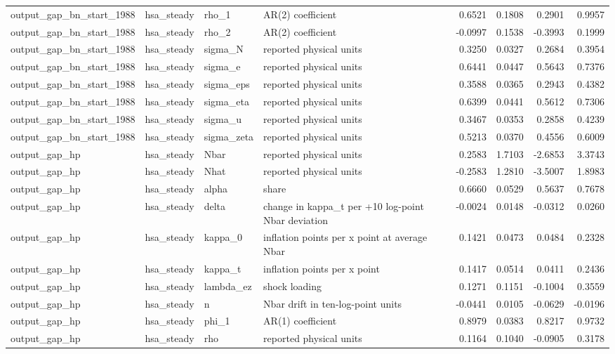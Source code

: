 \begin{tabular}{llllrrrr}
output\_gap\_bn\_start\_1988 & hsa\_steady & rho\_1 & AR(2) coefficient & 0.6521 & 0.1808 & 0.2901 & 0.9957 \\
output\_gap\_bn\_start\_1988 & hsa\_steady & rho\_2 & AR(2) coefficient & -0.0997 & 0.1538 & -0.3993 & 0.1999 \\
output\_gap\_bn\_start\_1988 & hsa\_steady & sigma\_N & reported physical units & 0.3250 & 0.0327 & 0.2684 & 0.3954 \\
output\_gap\_bn\_start\_1988 & hsa\_steady & sigma\_e & reported physical units & 0.6441 & 0.0447 & 0.5643 & 0.7376 \\
output\_gap\_bn\_start\_1988 & hsa\_steady & sigma\_eps & reported physical units & 0.3588 & 0.0365 & 0.2943 & 0.4382 \\
output\_gap\_bn\_start\_1988 & hsa\_steady & sigma\_eta & reported physical units & 0.6399 & 0.0441 & 0.5612 & 0.7306 \\
output\_gap\_bn\_start\_1988 & hsa\_steady & sigma\_u & reported physical units & 0.3467 & 0.0353 & 0.2858 & 0.4239 \\
output\_gap\_bn\_start\_1988 & hsa\_steady & sigma\_zeta & reported physical units & 0.5213 & 0.0370 & 0.4556 & 0.6009 \\
output\_gap\_hp & hsa\_steady & Nbar & reported physical units & 0.2583 & 1.7103 & -2.6853 & 3.3743 \\
output\_gap\_hp & hsa\_steady & Nhat & reported physical units & -0.2583 & 1.2810 & -3.5007 & 1.8983 \\
output\_gap\_hp & hsa\_steady & alpha & share & 0.6660 & 0.0529 & 0.5637 & 0.7678 \\
output\_gap\_hp & hsa\_steady & delta & change in kappa\_t per +10 log-point Nbar deviation & -0.0024 & 0.0148 & -0.0312 & 0.0260 \\
output\_gap\_hp & hsa\_steady & kappa\_0 & inflation points per x point at average Nbar & 0.1421 & 0.0473 & 0.0484 & 0.2328 \\
output\_gap\_hp & hsa\_steady & kappa\_t & inflation points per x point & 0.1417 & 0.0514 & 0.0411 & 0.2436 \\
output\_gap\_hp & hsa\_steady & lambda\_ez & shock loading & 0.1271 & 0.1151 & -0.1004 & 0.3559 \\
output\_gap\_hp & hsa\_steady & n & Nbar drift in ten-log-point units & -0.0441 & 0.0105 & -0.0629 & -0.0196 \\
output\_gap\_hp & hsa\_steady & phi\_1 & AR(1) coefficient & 0.8979 & 0.0383 & 0.8217 & 0.9732 \\
output\_gap\_hp & hsa\_steady & rho & reported physical units & 0.1164 & 0.1040 & -0.0905 & 0.3178 \\

\end{tabular}

